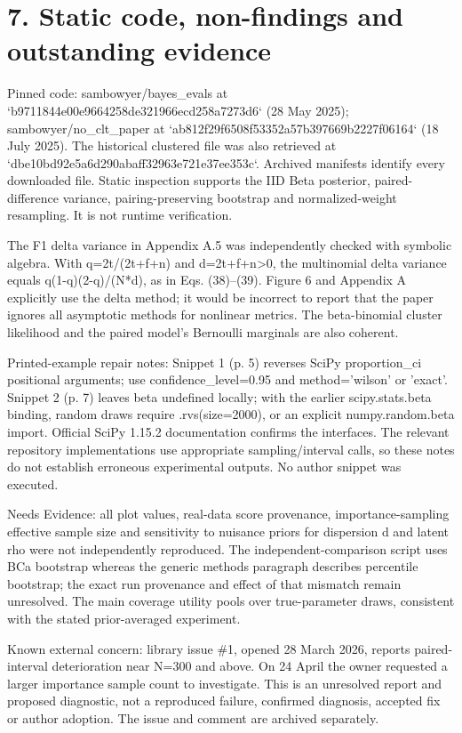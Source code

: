 \documentclass[10pt]{article}
\begin{document}
\section*{7. Static code, non-findings and outstanding evidence}
Pinned code: sambowyer/bayes\_evals at `b9711844e00e9664258de321966ecd258a7273d6` (28 May 2025); sambowyer/no\_clt\_paper at `ab812f29f6508f53352a57b397669b2227f06164` (18 July 2025). The historical clustered file was also retrieved at `dbe10bd92e5a6d290abaff32963e721e37ee353c`. Archived manifests identify every downloaded file. Static inspection supports the IID Beta posterior, paired-difference variance, pairing-preserving bootstrap and normalized-weight resampling. It is not runtime verification.\par
The F1 delta variance in Appendix A.5 was independently checked with symbolic algebra. With q=2t/(2t+f+n) and d=2t+f+n>0, the multinomial delta variance equals q(1-q)(2-q)/(N*d), as in Eqs. (38)–(39). Figure 6 and Appendix A explicitly use the delta method; it would be incorrect to report that the paper ignores all asymptotic methods for nonlinear metrics. The beta-binomial cluster likelihood and the paired model’s Bernoulli marginals are also coherent.\par
Printed-example repair notes: Snippet 1 (p. 5) reverses SciPy proportion\_ci positional arguments; use confidence\_level=0.95 and method=’wilson’ or ’exact’. Snippet 2 (p. 7) leaves beta undefined locally; with the earlier scipy.stats.beta binding, random draws require .rvs(size=2000), or an explicit numpy.random.beta import. Official SciPy 1.15.2 documentation confirms the interfaces. The relevant repository implementations use appropriate sampling/interval calls, so these notes do not establish erroneous experimental outputs. No author snippet was executed.\par
Needs Evidence: all plot values, real-data score provenance, importance-sampling effective sample size and sensitivity to nuisance priors for dispersion d and latent rho were not independently reproduced. The independent-comparison script uses BCa bootstrap whereas the generic methods paragraph describes percentile bootstrap; the exact run provenance and effect of that mismatch remain unresolved. The main coverage utility pools over true-parameter draws, consistent with the stated prior-averaged experiment.\par
Known external concern: library issue \#1, opened 28 March 2026, reports paired-interval deterioration near N=300 and above. On 24 April the owner requested a larger importance sample count to investigate. This is an unresolved report and proposed diagnostic, not a reproduced failure, confirmed diagnosis, accepted fix or author adoption. The issue and comment are archived separately.\par
\end{document}
